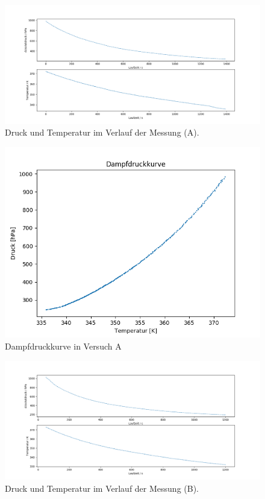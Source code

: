 \documentclass[12pt,a4paper]{article}
\begin{document}
\begin{figure}[H]
\centering
\includegraphics[width=0.9\linewidth]{Bilder/Rohdaten_HauptmessungA.png}
\caption[Rohdaten A]{Druck und Temperatur im Verlauf der Messung (A).}
\label{fig:RohdatenA}
\end{figure}


\begin{figure}[H]
\centering
\includegraphics[width=0.8\linewidth]{Bilder/DampfdruckkurveA.png}
\caption[Dampfdruckkurve A]{Dampfdruckkurve in Versuch A}
\label{fig:DampfA}
\end{figure}

\begin{figure}[H]
\begin{center}
\includegraphics[width=0.9\linewidth]{Bilder/Rohdaten_HauptmessungB}
\caption[Rohdaten B]{Druck und Temperatur im Verlauf der Messung (B).}
\label{fig:RohdatenB}
\end{center}
\end{figure}
\end{document}
